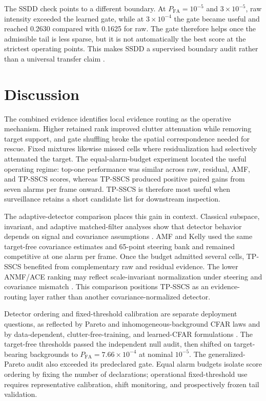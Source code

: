 \documentclass[journal]{IEEEtran}
\begin{document}
The SSDD check points to a different boundary. At $P_{\mathrm{FA}}=10^{-5}$ and $3\times10^{-5}$, raw intensity exceeded the learned gate, while at $3\times10^{-4}$ the gate became useful and reached 0.2630 compared with 0.1625 for raw. The gate therefore helps once the admissible tail is less sparse, but it is not automatically the best score at the strictest operating points. This makes SSDD a supervised boundary audit rather than a universal transfer claim \cite{wang2019ssdd,zhang2021ssdd}.

\section{Discussion}

The combined evidence identifies local evidence routing as the operative mechanism. Higher retained rank improved clutter attenuation while removing target support, and gate shuffling broke the spatial correspondence needed for rescue. Fixed mixtures likewise missed cells where residualization had selectively attenuated the target. The equal-alarm-budget experiment located the useful operating regime: top-one performance was similar across raw, residual, AMF, and TP-SSCS scores, whereas TP-SSCS produced positive paired gains from seven alarms per frame onward. TP-SSCS is therefore most useful when surveillance retains a short candidate list for downstream inspection.

The adaptive-detector comparison places this gain in context. Classical subspace, invariant, and adaptive matched-filter analyses show that detector behavior depends on signal and covariance assumptions \cite{scharf1994matched,kraut2001adaptive,demaio2007rao,conte1996amf,demaio2010invariance,liu2014doublesubspace}. AMF and Kelly used the same target-free covariance estimates and 65-point steering bank and remained competitive at one alarm per frame. Once the budget admitted several cells, TP-SSCS benefited from complementary raw and residual evidence. The lower ANMF/ACE ranking may reflect scale-invariant normalization under steering and covariance mismatch \cite{candan2023covariance,ollila2012compound}. This comparison positions TP-SSCS as an evidence-routing layer rather than another covariance-normalized detector.

Detector ordering and fixed-threshold calibration are separate deployment questions, as reflected by Pareto and inhomogeneous-background CFAR laws and by data-dependent, clutter-free-training, and learned-CFAR formulations \cite{weinberg2013pareto,vancao2014weibull,qu2025np,gini1999clairvoyant,rong2022clutterfree,diskin2024cfarnet}. The target-free thresholds passed the independent null audit, then shifted on target-bearing backgrounds to $P_{\mathrm{FA}}=7.66\times10^{-4}$ at nominal $10^{-5}$. The generalized-Pareto audit also exceeded its predeclared gate. Equal alarm budgets isolate score ordering by fixing the number of declarations; operational fixed-threshold use requires representative calibration, shift monitoring, and prospectively frozen tail validation.
\end{document}
